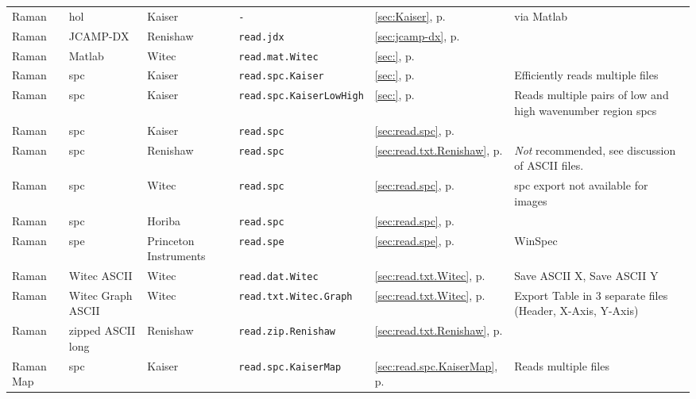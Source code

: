 \documentclass[english, a4paper, 10pt, headings=small, DIV11]{scrartcl}
\newcommand{\Rfunction}[2][]{\texorpdfstring{\nohyphens{#1\texttt{#2}}}{#2}}
\begin{document}
\begin{footnotesize}
\begin{tabular}{@{} l l l l l >{\raggedright}p{2.7cm}}
Raman& hol & Kaiser & \Rfunction{-} & \ref{sec:Kaiser}, p. \pageref{sec:Kaiser} & via Matlab\tabularnewline
Raman& JCAMP-DX & Renishaw & \Rfunction{read.jdx} & \ref{sec:jcamp-dx}, p. \pageref{sec:jcamp-dx} & \tabularnewline
Raman& Matlab & Witec & \Rfunction{read.mat.Witec} & \ref{sec:}, p. \pageref{sec:} & \tabularnewline
Raman& spc & Kaiser & \Rfunction{read.spc.Kaiser} & \ref{sec:}, p. \pageref{sec:} & Efficiently reads multiple files\tabularnewline
Raman& spc & Kaiser & \Rfunction{read.spc.KaiserLowHigh} & \ref{sec:}, p. \pageref{sec:} & Reads multiple pairs of low and high wavenumber region spcs\tabularnewline
Raman& spc & Kaiser & \Rfunction{read.spc} & \ref{sec:read.spc}, p. \pageref{sec:read.spc} & \tabularnewline
Raman& spc & Renishaw & \Rfunction{read.spc} & \ref{sec:read.txt.Renishaw}, p. \pageref{sec:read.txt.Renishaw} & \emph{Not} recommended, see discussion of ASCII files.\tabularnewline
Raman& spc & Witec & \Rfunction{read.spc} & \ref{sec:read.spc}, p. \pageref{sec:read.spc} & spc export not available for images\tabularnewline
Raman& spc & Horiba & \Rfunction{read.spc} & \ref{sec:read.spc}, p. \pageref{sec:read.spc} & \tabularnewline
Raman& spe & Princeton Instruments & \Rfunction{read.spe} & \ref{sec:read.spe}, p. \pageref{sec:read.spe} & WinSpec\tabularnewline
Raman& Witec ASCII & Witec & \Rfunction{read.dat.Witec} & \ref{sec:read.txt.Witec}, p. \pageref{sec:read.txt.Witec} & Save ASCII X, Save ASCII Y\tabularnewline
Raman& Witec Graph ASCII & Witec & \Rfunction{read.txt.Witec.Graph} & \ref{sec:read.txt.Witec}, p. \pageref{sec:read.txt.Witec} & Export Table in 3 separate files (Header, X-Axis, Y-Axis)\tabularnewline
Raman& zipped ASCII long & Renishaw & \Rfunction{read.zip.Renishaw} & \ref{sec:read.txt.Renishaw}, p. \pageref{sec:read.txt.Renishaw} & \tabularnewline
Raman Map& spc & Kaiser & \Rfunction{read.spc.KaiserMap} & \ref{sec:read.spc.KaiserMap}, p. \pageref{sec:read.spc.KaiserMap} & Reads multiple files\tabularnewline\end{tabular}
\end{footnotesize}
\end{document}
